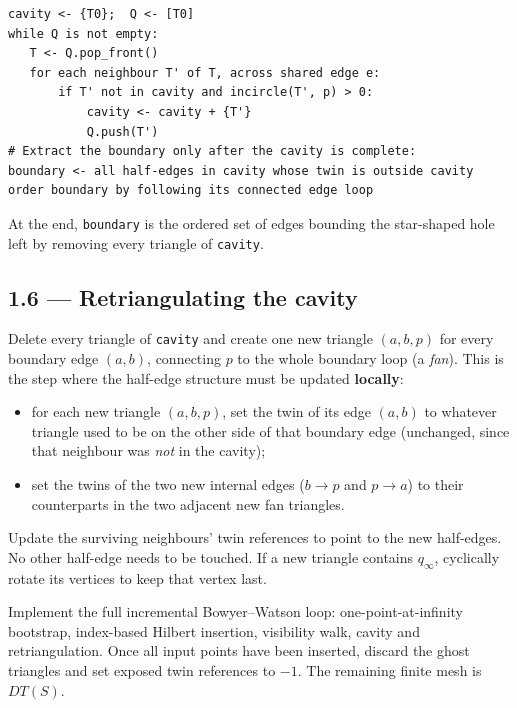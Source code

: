 \documentclass[11pt,a4paper]{article}
\begin{document}
\begin{lstlisting}[style=code,caption={Cavity computation (BFS)},captionpos=b]
cavity <- {T0};  Q <- [T0]
while Q is not empty:
   T <- Q.pop_front()
   for each neighbour T' of T, across shared edge e:
       if T' not in cavity and incircle(T', p) > 0:
           cavity <- cavity + {T'}
           Q.push(T')
# Extract the boundary only after the cavity is complete:
boundary <- all half-edges in cavity whose twin is outside cavity
order boundary by following its connected edge loop
\end{lstlisting}

At the end, \lstinline{boundary} is the ordered set of edges bounding the
star-shaped hole left by removing every triangle of \lstinline{cavity}.

\subsection*{1.6 --- Retriangulating the cavity}

Delete every triangle of \lstinline{cavity} and create one new triangle
$(a,b,p)$ for every boundary edge $(a,b)$, connecting $p$ to the whole
boundary loop (a \emph{fan}). This is the step where the half-edge structure
must be updated \textbf{locally}:

\begin{itemize}[leftmargin=1.4em]
  \item for each new triangle $(a,b,p)$, set the twin of its edge $(a,b)$ to
    whatever triangle used to be on the other side of that boundary edge
    (unchanged, since that neighbour was \emph{not} in the cavity);
  \item set the twins of the two new internal edges ($b\!\to\!p$ and
    $p\!\to\!a$) to their counterparts in the two adjacent new fan triangles.
\end{itemize}

Update the surviving neighbours' twin references to point to the new
half-edges. No other half-edge needs to be touched. If a new triangle
contains $q_\infty$, cyclically rotate its vertices to keep that vertex last.

\begin{task}\label{tsk:bowyerwatson}
Implement the full incremental Bowyer--Watson loop: one-point-at-infinity
bootstrap, index-based Hilbert insertion, visibility walk, cavity and
retriangulation. Once all input points have been inserted, discard the
ghost triangles and set exposed twin references to $-1$. The remaining
finite mesh is $DT(S)$.
\end{task}
\end{document}
